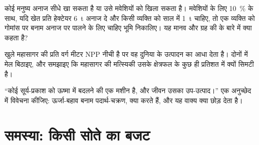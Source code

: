 \begin{exercise}[$\star\star\star$]\label{exo:b1:ecosystem-organization:10}
कोई मनुष्य अनाज सीधे खा सकता है या उसे मवेशियों को खिला सकता है। मवेशियों
के लिए \qty{10}{\%}  के साथ, यदि खेत प्रति हेक्टेयर \qty{6}{t}
अनाज दे और किसी व्यक्ति को साल में \qty{1}{t} चाहिए, तो एक व्यक्ति को
गोमांस पर बनाम अनाज पर पालने के लिए चाहिए भूमि निकालिए। यह मानव 
और ग्रह की  के बारे में क्या कहता है?
\end{exercise}

\begin{exercise}[$\star\star\star$]\label{exo:b1:ecosystem-organization:11}
खुले महासागर की प्रति वर्ग मीटर NPP नीची है पर वह दुनिया के उत्पादन का
आधा देता है। दोनों में मेल बिठाइए, और समझाइए कि महासागर की मत्स्यिकी उसके
क्षेत्रफल के कुछ ही प्रतिशत में क्यों सिमटी है।
\end{exercise}

\begin{exercise}[$\star\star\star$]\label{exo:b1:ecosystem-organization:12}
``कोई  सूर्य-प्रकाश को ऊष्मा में बदलने की एक मशीन है, और जीवन
उसका उप-उत्पाद।'' एक अनुच्छेद में विवेचना कीजिए: ऊर्जा-बहाव बनाम
पदार्थ-चक्रण,  क्या करते हैं, और यह वाक्य क्या छोड़ देता है।
\end{exercise}

\section{समस्या: किसी सोते का बजट}


